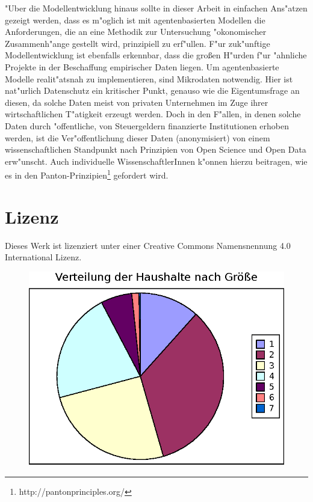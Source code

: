 \documentclass[11pt,a4paper]{article}
\begin{document}
"Uber die Modellentwicklung hinaus sollte in dieser Arbeit in einfachen Ans"atzen gezeigt werden, dass es m"oglich ist mit agentenbasierten Modellen die Anforderungen, die an eine Methodik zur Untersuchung "okonomischer Zusammenh"ange gestellt wird, prinzipiell zu erf"ullen. F"ur zuk"unftige Modellentwicklung ist ebenfalls erkennbar, dass die großen H"urden f"ur "ahnliche Projekte in der Beschaffung empirischer Daten liegen. Um agentenbasierte Modelle realit"atsnah zu implementieren, sind Mikrodaten notwendig. Hier ist nat"urlich Datenschutz ein kritischer Punkt, genauso wie die Eigentumsfrage an diesen, da solche Daten meist von privaten Unternehmen im Zuge ihrer wirtschaftlichen T"atigkeit erzeugt werden. Doch in den F"allen, in denen solche Daten durch "offentliche, von Steuergeldern finanzierte Institutionen erhoben werden, ist die Ver"offentlichung dieser Daten (anonymisiert) von einem wissenschaftlichen Standpunkt nach Prinzipien von Open Science und Open Data erw"unscht. Auch individuelle WissenschaftlerInnen k"onnen hierzu beitragen, wie es in den Panton-Prinzipien\footnote{http://pantonprinciples.org/} gefordert wird.\\

\section{Lizenz}

Dieses Werk ist lizenziert unter einer Creative Commons Namensnennung 4.0 International Lizenz.

\newpage





\newpage


\begin{figure}[h]
\centering
\includegraphics[width=\textwidth / 3 * 2]{./hh-size-distribution}
\caption{}
\label{fig:hh-size-distribution}
\end{figure}
\end{document}
